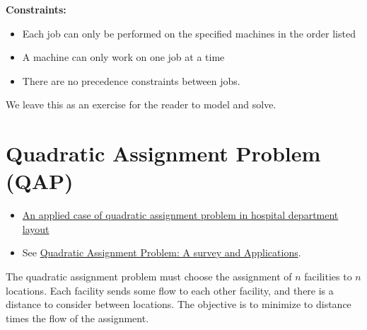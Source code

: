 {\textbf{Constraints:}
\begin{itemize}
    \item Each job can only be performed on the specified machines in the order listed
    \item A machine can only work on one job at a time
    \item There are no precedence constraints between jobs.
\end{itemize}
%

We leave this as an exercise for the reader to model and solve.

\section{Quadratic Assignment Problem (QAP)}
\begin{resource}{}{}
\begin{itemize}
\item \href{https://ieeexplore-ieee-org.ezproxy.lib.vt.edu/stamp/stamp.jsp?tp=&arnumber=7170278}{An applied case of quadratic assignment problem in hospital department layout}
\item See \href{https://www.semanticscholar.org/paper/Quadratic-Assignment-Problem%3A-A-survey-and-Shawky-Metwally/247b45613d6d3b6961fdad44f9e7fefb70fd3e82}{Quadratic Assignment Problem: A survey and Applications}.
\end{itemize}
\end{resource}
The quadratic assignment problem must choose the assignment of $n$ facilities to $n$ locations.  Each facility sends some flow to each other facility, and there is a distance to consider between locations.   
The objective is to minimize to distance times the flow of the assignment.


}
